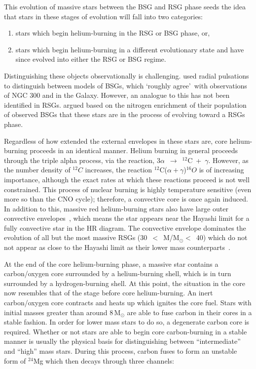 This evolution of massive stars between the BSG and RSG phase seeds the idea that stars in these stages of evolution will fall into two categories:

\begin{enumerate}
    \item stars which begin helium-burning in the RSG or BSG phase, or,
    \item stars which begin helium-burning in a different evolutionary state and have since evolved into either the RSG or BSG regime.
\end{enumerate}

Distinguishing these objects observationally is challenging.
\cite{Saio13} used radial pulsations to distinguish between models of BSGs, which \textquoteleft roughly agree\textquoteright ~with observations of NGC 300 and in the Galaxy.
However, an analogue to this has not been identified in RSGs.
\cite{2012A&A...542A..79C} argued based on the nitrogen enrichment of their population of observed BSGs that these stars are in the process of evolving toward a RSGs phase.

Regardless of how extended the external envelopes in these stars are, core helium-burning proceeds in an identical manner.
Helium burning in general proceeds through the triple alpha process, via the reaction, 3$\alpha$~$\rightarrow$~$^{12}$C~+~$\gamma$.
However, as the number density of $^{12}C$ increases, the reaction $^{12}$C($\alpha+\gamma$)$^{16}O$ is of increasing importance, although the exact rates at which these reactions proceed is not well constrained.
This process of nuclear burning is highly temperature sensitive (even more so than the CNO cycle); therefore, a convective core is once again induced.
In addition to this, massive red helium-burning stars also have large outer convective envelopes~\citep{2012sse..book.....K}, which means the star appears near the Hayashi limit for a fully convective star in the HR diagram.
The convective envelope dominates the evolution of all but the most massive RSGs (30~$<$~M/M$_{\odot}<$~40) which do not not appear as close to the Hayashi limit as their lower mass counterparts~\citep[see Figure 1 in][]{Saio13}.

At the end of the core helium-burning phase, a massive star contains a carbon/oxygen core surrounded by a helium-burning shell, which is in turn surrounded by a hydrogen-burning shell.
At this point, the situation in the core now resembles that of the stage before core helium-burning.
An inert carbon/oxygen core contracts and heats up which ignites the core fuel.
Stars with initial masses greater than around 8\,M$_{\odot}$ are able to fuse carbon in their cores in a stable fashion.
In order for lower mass stars to do so, a degenerate carbon core is required.
Whether or not stars are able to begin core carbon-burning in a stable manner is usually the physical basis for distinguishing between ``intermediate'' and ``high'' mass stars.
During this process, carbon fuses to form an unstable form of $^{24}$Mg which then decays through three channels:

